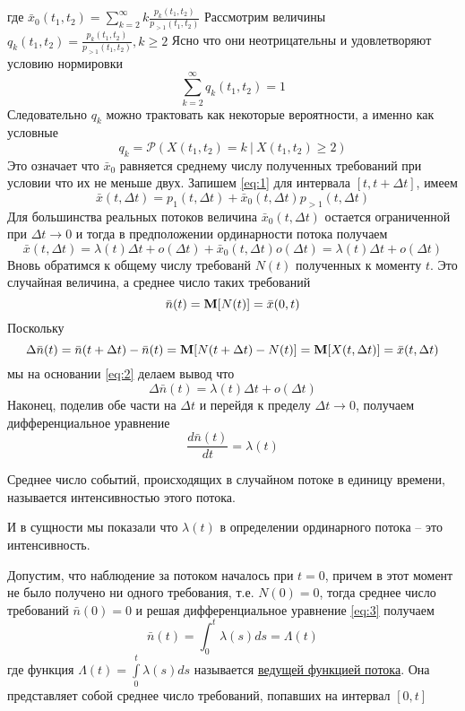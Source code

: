 где $\bar{x}_0 (t_1, t_2) = \sum_{k=2}^{\infty}{k \frac{p_k (t_1, t_2)}{p_{>1} (t_1, t_2)}}$
Рассмотрим величины $q_k (t_1, t_2) = \frac{p_k (t_1, t_2)}{p_{>1} (t_1, t_2)}, k \geq 2$
Ясно что они неотрицательны и удовлетворяют условию нормировки
$$\sum_{k=2}^{\infty}{q_k (t_1, t_2)} = 1$$
Следовательно $q_k$ можно трактовать как некоторые вероятности, а именно как условные
$$q_k = \mathcal{P}\left(X(t_1, t_2) = k \ | \ X(t_1, t_2) \geq 2\right)$$
Это означает что $\bar{x}_0$ равняется среднему числу полученных требований при условии что их не меньше двух. Запишем \eqref{eq:1} для интервала $[t, t + \Delta t]$, имеем 
$$\bar{x}(t, \Delta t) = p_1 (t, \Delta t) + \bar{x}_0 (t, \Delta t)p_{>1}(t, \Delta t)$$
Для большинства реальных потоков величина $\bar{x}_0 (t, \Delta t)$ остается ограниченной при $\Delta t \to 0$ и тогда в предположении ординарности потока получаем
\begin{equation}\label{eq:2}
	\bar{x}(t, \Delta t) = \lambda(t)\Delta t + o(\Delta t) + \bar{x}_0 (t, \Delta t) o(\Delta t) = \lambda(t)\Delta t + o(\Delta t)
\end{equation}
Вновь обратимся к общему числу требованй $N(t)$ полученных к моменту $t$. Это случайная величина, а среднее число таких требований
$$\bar{n}(t) = \mathbf{M}[N(t)] = \bar{x}(0, t)$$
Поскольку
$$\Delta \bar{n}(t) = \bar{n}(t + \Delta t) - \bar{n}(t) = \mathbf{M}[N(t + \Delta t) - N(t)] = \mathbf{M}[X(t, \Delta t)] = \bar{x}(t, \Delta t)$$
мы на основании \eqref{eq:2} делаем вывод что
$$\Delta \bar{n}(t) = \lambda(t) \Delta t + o(\Delta t)$$
Наконец, поделив обе части на $\Delta t$ и перейдя к пределу $\Delta t \to 0$, получаем дифференциальное уравнение
\begin{equation}
	\frac{d\bar{n}(t)}{dt} = \lambda(t)
\end{equation}
\begin{definition}\label{eq:3}
	Среднее число событий, происходящих в случайном потоке в единицу времени, называется {\color{red}интенсивностью} этого потока.
\end{definition}
И в сущности мы показали что $\lambda(t)$ в определении ординарного потока -- это интенсивность.

Допустим, что наблюдение за потоком началось при $t = 0$, причем в этот момент не было получено ни одного требования, т.е. $N(0) = 0$, тогда среднее число требований
$\bar{n}(0) = 0$ и решая дифференциальное уравнение \eqref{eq:3} получаем
$$\bar{n}(t) = \int_{0}^{t}{\lambda(s)ds} = \Lambda(t)$$
где функция $\Lambda(t) = \int\limits_{0}^{t}{\lambda(s)ds}$ называется \underline{ведущей функцией потока}. Она представляет собой среднее число требований, попавших на интервал $[0, t]$

